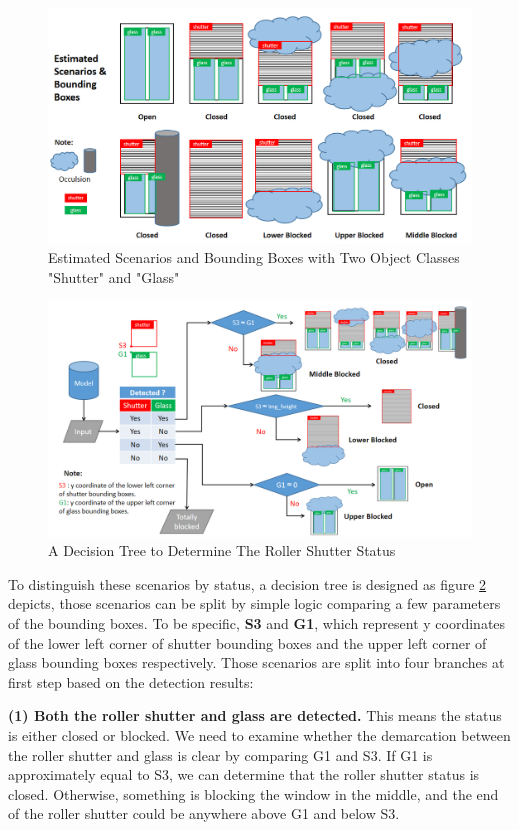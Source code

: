 \begin{figure}[h]
  \centering
 \includegraphics[width=1\textwidth]{Figures/Estimate BBs.png}
  \caption{Estimated Scenarios and Bounding Boxes with Two Object Classes "Shutter" and "Glass"
}
  \label{fig:10}
\end{figure}


\begin{figure}[h]
  \centering
 \includegraphics[width=1\textwidth]{Figures/Decision Tree.png}
  \caption{A Decision Tree to Determine The Roller Shutter Status
}
  \label{fig:11}
\end{figure}

To distinguish these scenarios by status, a decision tree is designed as figure \ref{fig:11} depicts, those scenarios can be split by simple logic comparing a few parameters of the bounding boxes. To be specific, \textbf{S3} and \textbf{G1}, which represent y coordinates of the lower left corner of shutter bounding boxes and the upper left corner of glass bounding boxes respectively. Those scenarios are split into four branches at first step based on the detection results:

\textbf{(1) Both the roller shutter and glass are detected.} This means the status is either closed or blocked. We need to examine whether the demarcation between the roller shutter and glass is clear by comparing G1 and S3. If G1 is approximately equal to S3, we can determine that the roller shutter status is closed. Otherwise, something is blocking the window in the middle, and the end of the roller shutter could be anywhere above G1 and below S3.

